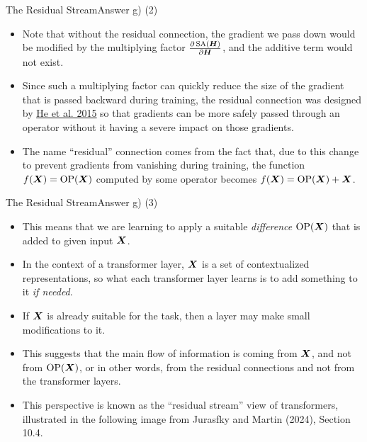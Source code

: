 \documentclass[t]{beamer}
\newcommand\op[1]{\operatorname{#1}}
\begin{document}
\begin{frame}{The Residual Stream}{Answer g) (2)}
    \begin{itemize}
        \item Note that without the residual connection, the gradient we pass
              down would be modified by the multiplying factor
              $\frac{\partial \op{SA}(\mH)}{\partial \mH}$, and the additive
              term would not exist.
        \item Since such a multiplying factor can quickly reduce the size of the
              gradient that is passed backward during training, the residual
              connection was designed by
              \href{https://arxiv.org/abs/1512.03385}{\underline{He et al. 2015}}
              so that gradients can be more safely passed through an operator
              without it having a severe impact on those gradients.
        \item The name ``residual'' connection comes from the fact that, due to
              this change to prevent gradients from vanishing during training,
              the function $f(\mX) = \op{OP}(\mX)$ computed by some operator
              becomes $f(\mX) = \op{OP}(\mX) + \mX$.
    \end{itemize}
\end{frame}

\begin{frame}{The Residual Stream}{Answer g) (3)}
    \begin{itemize}
        \item This means that we are learning to apply a suitable \emph{difference}
              $\op{OP}(\mX)$ that is added to given input ${\boldsymbol{X}}$.
        \item In the context of a transformer layer, ${\boldsymbol{X}}$ is a set of
              contextualized representations, so what each transformer layer
              learns is to add something to it \emph{if needed}.
        \item If ${\boldsymbol{X}}$ is already suitable for the task, then a layer may make
              small modifications to it.
        \item This suggests that the main flow of information is coming from
              ${\boldsymbol{X}}$, and not from $\op{OP}(\mX)$, or in other words, from the
              residual connections and not from the transformer layers.
        \item This perspective is known as the ``residual stream'' view of
              transformers, illustrated in the following image from Jurasfky and
              Martin (2024), Section 10.4.
    \end{itemize}
\end{frame}
\end{document}
